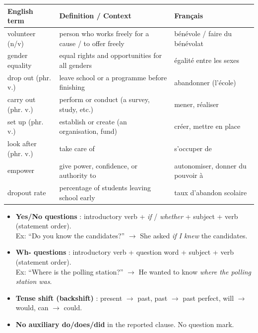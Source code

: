 \documentclass[11pt]{article}
\begin{document}
\begin{definition}
\begin{center}
\begin{tabularx}{\linewidth}{|l|X|l|}\hline
\textbf{English term} & \textbf{Definition / Context} & \textbf{Français} \\ \hline
volunteer (n/v) & person who works freely for a cause / to offer freely & bénévole / faire du bénévolat \\
gender equality & equal rights and opportunities for all genders & égalité entre les sexes \\
drop out (phr. v.) & leave school or a programme before finishing & abandonner (l'école) \\
carry out (phr. v.) & perform or conduct (a survey, study, etc.) & mener, réaliser \\
set up (phr. v.) & establish or create (an organisation, fund) & créer, mettre en place \\
look after (phr. v.) & take care of & s'occuper de \\
empower & give power, confidence, or authority to & autonomiser, donner du pouvoir à \\
dropout rate & percentage of students leaving school early & taux d'abandon scolaire \\ \hline
\end{tabularx}
\end{center}
\end{definition}

\begin{propriete}
\begin{itemize}
\item \textbf{Yes/No questions} : introductory verb + \emph{if} / \emph{whether} + subject + verb (statement order).\\
Ex: ``Do you know the candidates?'' $\rightarrow$ She asked \emph{if I knew} the candidates.
\item \textbf{Wh- questions} : introductory verb + question word + subject + verb (statement order).\\
Ex: ``Where is the polling station?'' $\rightarrow$ He wanted to know \emph{where the polling station was}.
\item \textbf{Tense shift (backshift)} : present $\rightarrow$ past, past $\rightarrow$ past perfect, will $\rightarrow$ would, can $\rightarrow$ could.
\item \textbf{No auxiliary do/does/did} in the reported clause. No question mark.
\end{itemize}
\end{propriete}
\end{document}

